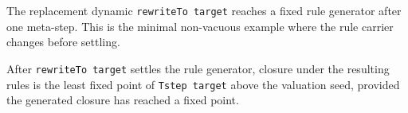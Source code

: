 \begin{theorem}\label{thm:rewrite-to-fixed-at-one}\leanok{}
The replacement dynamic \texttt{rewriteTo target} reaches a fixed rule generator
after one meta-step. This is the minimal non-vacuous example where the rule
carrier changes before settling.
\end{theorem}

\begin{theorem}\label{thm:rewrite-to-closure-lfp}\leanok{}
After \texttt{rewriteTo target} settles the rule generator, closure under the
resulting rules is the least fixed point of \texttt{Tstep target} above the
valuation seed, provided the generated closure has reached a fixed point.
\end{theorem}
